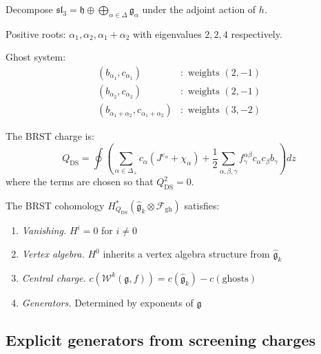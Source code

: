 \begin{construction}\label{const:brst-sl3}
Decompose $\mathfrak{sl}_3 = \mathfrak{h} \oplus \bigoplus_{\alpha \in \Delta} \mathfrak{g}_\alpha$ under the adjoint action of $h$.

Positive roots: $\alpha_1, \alpha_2, \alpha_1 + \alpha_2$ with eigenvalues $2, 2, 4$ respectively.

Ghost system:
\begin{align}
(b_{\alpha_1}, c_{\alpha_1}) &: \text{ weights } (2, -1) \\
(b_{\alpha_2}, c_{\alpha_2}) &: \text{ weights } (2, -1) \\
(b_{\alpha_1+\alpha_2}, c_{\alpha_1+\alpha_2}) &: \text{ weights } (3, -2)
\end{align}

The BRST charge is:
\begin{equation}
Q_{\text{DS}} = \oint \left( \sum_{\alpha \in \Delta_+} c_\alpha (J^{e_\alpha} + \chi_\alpha) + \frac{1}{2}\sum_{\alpha,\beta,\gamma} f^{\alpha\beta}_\gamma c_\alpha c_\beta b_\gamma \right) dz
\end{equation}
where the terms are chosen so that $Q_{\text{DS}}^2 = 0$.
\end{construction}

\begin{theorem}\label{thm:brst-properties}
The BRST cohomology $H^*_{Q_{\text{DS}}}(\widehat{\mathfrak{g}}_k \otimes \mathcal{F}_{\text{gh}})$ satisfies:
\begin{enumerate}
\item \emph{Vanishing.} $H^i = 0$ for $i \neq 0$
\item \emph{Vertex algebra.} $H^0$ inherits a vertex algebra structure from $\widehat{\mathfrak{g}}_k$
\item \emph{Central charge.} $c(\mathcal{W}^k(\mathfrak{g}, f)) = c(\widehat{\mathfrak{g}}_k) - c(\text{ghosts})$
\item \emph{Generators.} Determined by exponents of $\mathfrak{g}$
\end{enumerate}
\end{theorem}

\subsection{Explicit generators from screening charges}

